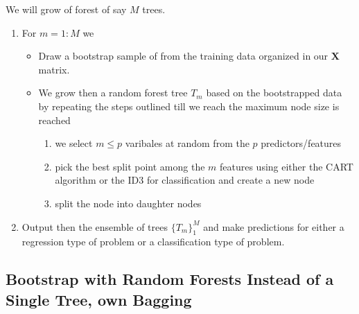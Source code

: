 \documentclass[%
oneside,                 %
final,                   %
10pt]{article}
\begin{document}
We will grow of forest of say $M$ trees.
\begin{enumerate}
\item For $m=1:M$ we
\begin{itemize}

  \item Draw a bootstrap sample of from the training data organized in our $\bm{X}$ matrix.

  \item We grow then a random forest tree $T_m$ based on the bootstrapped data by repeating the steps outlined till we reach the maximum node size is reached
\begin{enumerate}

   \item we select $m \le p$ varibales at random from the $p$ predictors/features

   \item pick the best split point among the $m$ features using either the CART algorithm or the ID3 for classification and create a new node

   \item split the node into daughter nodes

\end{enumerate}

\noindent
\end{itemize}

\noindent
\item Output then the ensemble of trees $\{T_m\}_1^{M}$ and make predictions for either a regression type of problem or a classification type of problem. 
\end{enumerate}

\noindent
\subsection*{Bootstrap with Random Forests Instead of a Single Tree, own Bagging}
\end{document}
